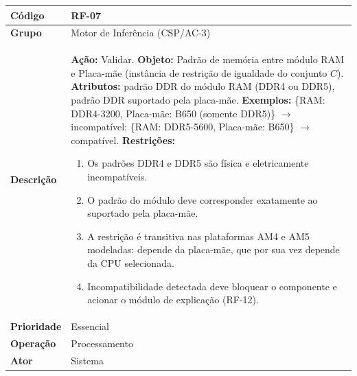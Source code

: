 \FloatBarrier
\begin{quadro}[htb]
  \caption{RF-07 -- Validar padrão de memória RAM--Placa-mãe}
  \label{quad:rf07}
  \begin{tabular}{|p{3.2cm}|p{11.8cm}|}
    \hline
    \textbf{Código}     & RF-07                                                                             \\ \hline
    \textbf{Grupo}      & Motor de Inferência (CSP/AC-3)                                                    \\ \hline
    \textbf{Descrição}  &
    \textbf{Ação:} Validar.
    \textbf{Objeto:} Padrão de memória entre módulo RAM e Placa-mãe (instância de restrição de igualdade do conjunto $C$).
    \textbf{Atributos:} padrão DDR do módulo RAM (DDR4 ou DDR5), padrão DDR suportado pela placa-mãe.
    \textbf{Exemplos:} \{RAM: DDR4-3200, Placa-mãe: B650 (somente DDR5)\} $\rightarrow$ incompatível; \{RAM: DDR5-5600, Placa-mãe: B650\} $\rightarrow$ compatível.
    \textbf{Restrições:}
    \begin{enumerate}[nosep,leftmargin=1.2em,topsep=2pt,partopsep=0pt,parsep=0pt,itemsep=1pt]
      \item Os padrões DDR4 e DDR5 são física e eletricamente incompatíveis.
      \item O padrão do módulo deve corresponder exatamente ao suportado pela placa-mãe.
      \item A restrição é transitiva nas plataformas AM4 e AM5 modeladas: depende da placa-mãe, que por sua vez depende da CPU selecionada.
      \item Incompatibilidade detectada deve bloquear o componente e acionar o módulo de explicação (RF-12).
    \end{enumerate} \\ \hline
    \textbf{Prioridade} & Essencial                                                                         \\ \hline
    \textbf{Operação}   & Processamento                                                                     \\ \hline
    \textbf{Ator}       & Sistema                                                                           \\ \hline
  \end{tabular}
\end{quadro}
